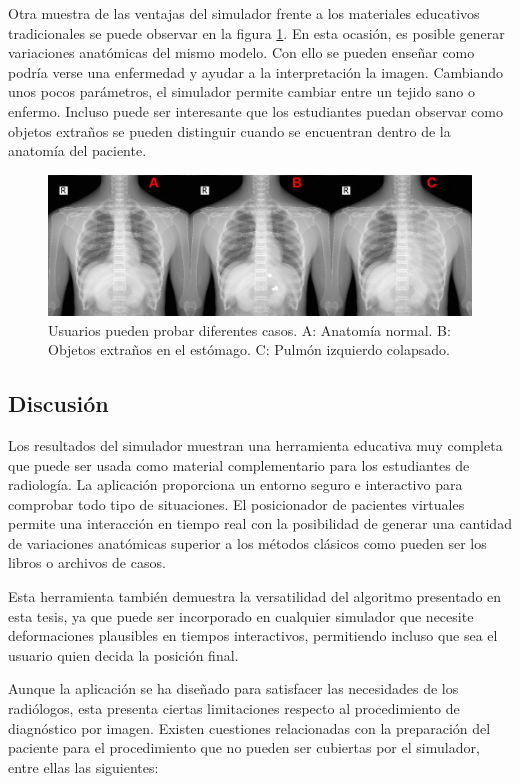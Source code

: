 Otra muestra de las ventajas del simulador frente a los materiales educativos tradicionales se puede observar en la figura \ref{fig:resultdisease}. En esta ocasión, es posible generar variaciones anatómicas del mismo modelo. Con ello se pueden enseñar como podría verse una enfermedad y ayudar a la interpretación la imagen. Cambiando unos pocos parámetros, el simulador permite cambiar entre un tejido sano o enfermo. Incluso puede ser interesante que los estudiantes puedan observar como objetos extraños se pueden distinguir cuando se encuentran dentro de la anatomía del paciente. 

\begin{figure}[tb]
\centering
\includegraphics[width=0.5\linewidth]{IMG/disease.png}
\caption{\label{fig:resultdisease}Usuarios pueden probar diferentes casos. A: Anatomía normal. B: Objetos extraños en el estómago. C: Pulmón izquierdo colapsado. }
\end{figure}

\subsection{Discusión}

Los resultados del simulador muestran una herramienta educativa muy completa que puede ser usada como material complementario para los estudiantes de radiología. La aplicación proporciona un entorno seguro e interactivo para comprobar todo tipo de situaciones. El posicionador de pacientes virtuales permite una interacción en tiempo real con la posibilidad de generar una cantidad de variaciones anatómicas superior a los métodos clásicos como pueden ser los libros o archivos de casos.

Esta herramienta también demuestra la versatilidad del algoritmo presentado en esta tesis, ya que puede ser incorporado en cualquier simulador que necesite deformaciones plausibles en tiempos interactivos, permitiendo incluso que sea el usuario quien decida la posición final.

Aunque la aplicación se ha diseñado para satisfacer las necesidades de los radiólogos, esta presenta ciertas limitaciones respecto al procedimiento de diagnóstico por imagen. Existen cuestiones relacionadas con la preparación del paciente para el procedimiento que no pueden ser cubiertas por el simulador, entre ellas las siguientes:

